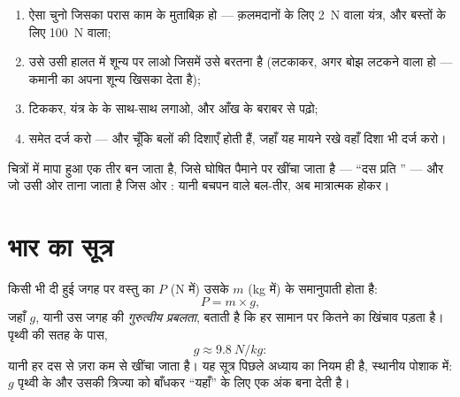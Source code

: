 \begin{method}[किसी बल को मापना]\label{met:g9:weight-vs-mass:measure}
\begin{enumerate}
  \item ऐसा  चुनो जिसका परास काम के मुताबिक़ हो --- क़लमदानों के
        लिए \qty{2}{N} वाला यंत्र, और बस्तों के लिए \qty{100}{N}
        वाला;
  \item उसे उसी हालत में शून्य पर लाओ जिसमें उसे बरतना है (लटकाकर,
        अगर बोझ लटकने वाला हो --- कमानी का अपना  शून्य खिसका देता
        है);
  \item {} टिककर, यंत्र के  के साथ-साथ लगाओ, और आँख के बराबर से
        पढ़ो;
  \item {} समेत दर्ज करो --- और चूँकि बलों की दिशाएँ होती हैं,
        जहाँ यह मायने रखे वहाँ दिशा भी दर्ज करो।
\end{enumerate}
चित्रों में मापा हुआ  एक तीर बन जाता है, जिसे घोषित पैमाने पर खींचा
जाता है --- ``दस  प्रति '' --- और जो उसी ओर ताना जाता
है जिस ओर : यानी बचपन वाले बल-तीर, अब मात्रात्मक होकर।
\end{method}

\section{भार का सूत्र}

\begin{proposition}[भार द्रव्यमान के समानुपाती है]\label{prop:g9:weight-vs-mass:formula}
किसी भी दी हुई जगह पर वस्तु का  $P$ (\unit{N} में) उसके 
$m$ (\unit{kg} में) के समानुपाती होता है:
\[
P = m \times g ,
\]
जहाँ $g$, यानी उस जगह की \emph{गुरुत्वीय प्रबलता}, बताती है कि हर  सामान पर कितने  का खिंचाव
पड़ता है। पृथ्वी की सतह के पास,
\[
g \approx \qty{9.8}{N/kg}:
\]
यानी हर  दस से ज़रा कम  से खींचा जाता है। यह सूत्र
पिछले अध्याय का नियम ही है, स्थानीय पोशाक में: $g$ पृथ्वी के 
और उसकी त्रिज्या को बाँधकर ``यहाँ'' के लिए एक अंक बना देती है।
\end{proposition}

